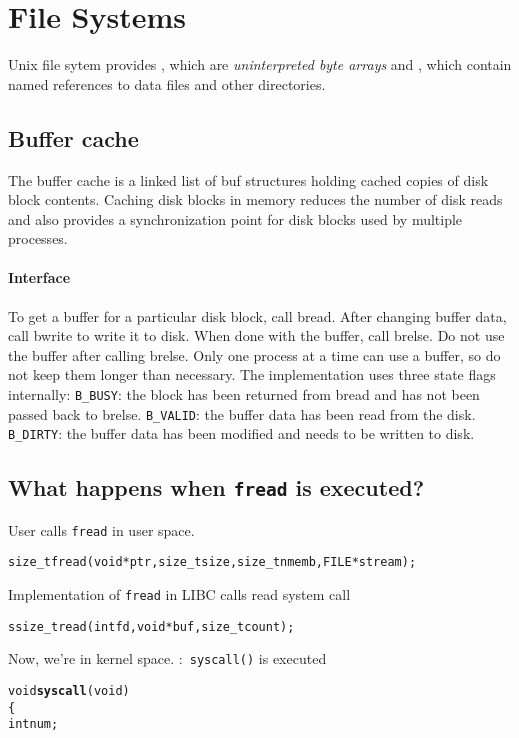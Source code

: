 \documentclass{note}
\begin{document}
{\pagebreak
\section{File Systems}
\bit
\w Unix file sytem provides , which are {\em uninterpreted byte
  arrays\/} and , which contain named references to data files
and other directories.
\eit

\subsection{Buffer cache}
 The buffer cache is a linked list of buf structures holding
 cached copies of disk block contents.  Caching disk blocks
 in memory reduces the number of disk reads and also provides
 a synchronization point for disk blocks used by multiple processes.

\paragraph{Interface}
\bit
\w To get a buffer for a particular disk block, call bread.
\w After changing buffer data, call bwrite to write it to disk.
\w When done with the buffer, call brelse.
\w Do not use the buffer after calling brelse.
\w Only one process at a time can use a buffer,
\w so do not keep them longer than necessary.
\eit
The implementation uses three state flags internally:
\bit
\w \verb+B_BUSY+: the block has been returned from bread
     and has not been passed back to brelse.  
\w \verb+B_VALID+: the buffer data has been read from the disk.
\w \verb+B_DIRTY+: the buffer data has been modified
     and needs to be written to disk.
\eit


\subsection{What happens when \texttt{fread} is executed?}
\bit
\w User calls \texttt{fread} in user space.
\begin{alltt}
  size_t fread(void *ptr, size_t size, size_t nmemb, FILE *stream);
\end{alltt}
\w Implementation of \texttt{fread} in LIBC calls read system call
\begin{alltt}
  ssize_t read(int fd, void *buf, size_t count);
\end{alltt}
\w Now, we're in kernel space.
\w {}:\  \texttt{syscall()} is executed
  \begin{alltt}
  void \textbf{syscall}(void)
  \{
    int num;


\end{alltt}}
\end{document}
